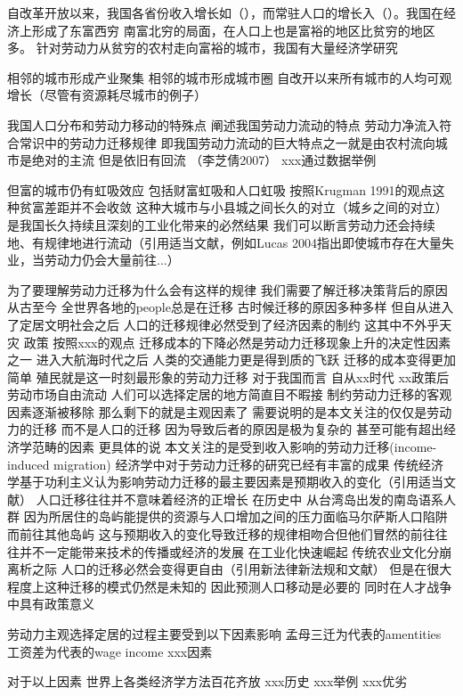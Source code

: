 \documentclass[10pt,a4paper]{article}
\begin{document}
自改革开放以来，我国各省份收入增长如（），而常驻人口的增长入（）。我国在经济上形成了东富西穷 南富北穷的局面，在人口上也是富裕的地区比贫穷的地区多。
针对劳动力从贫穷的农村走向富裕的城市，我国有大量经济学研究

相邻的城市形成产业聚集 相邻的城市形成城市圈 自改开以来所有城市的人均可观增长（尽管有资源耗尽城市的例子）

我国人口分布和劳动力移动的特殊点
阐述我国劳动力流动的特点
劳动力净流入符合常识中的劳动力迁移规律
即我国劳动力流动的巨大特点之一就是由农村流向城市是绝对的主流
但是依旧有回流
（李芝倩2007）
xxx通过数据举例

但富的城市仍有虹吸效应 包括财富虹吸和人口虹吸 按照Krugman 1991的观点这种贫富差距并不会收敛
这种大城市与小县城之间长久的对立（城乡之间的对立）是我国长久持续且深刻的工业化带来的必然结果 
我们可以断言劳动力还会持续地、有规律地进行流动（引用适当文献，例如Lucas 2004指出即使城市存在大量失业，当劳动力仍会大量前往...）


为了要理解劳动力迁移为什么会有这样的规律
我们需要了解迁移决策背后的原因
从古至今 全世界各地的people总是在迁移
古时候迁移的原因多种多样
但自从进入了定居文明社会之后 人口的迁移规律必然受到了经济因素的制约
这其中不外乎天灾 政策
按照xxx的观点 迁移成本的下降必然是劳动力迁移现象上升的决定性因素之一
进入大航海时代之后 人类的交通能力更是得到质的飞跃 迁移的成本变得更加简单 殖民就是这一时刻最形象的劳动力迁移
对于我国而言 自从xx时代 xx政策后 劳动市场自由流动 人们可以选择定居的地方简直目不暇接
制约劳动力迁移的客观因素逐渐被移除 那么剩下的就是主观因素了
需要说明的是本文关注的仅仅是劳动力的迁移 而不是人口的迁移 因为导致后者的原因是极为复杂的 甚至可能有超出经济学范畴的因素 更具体的说 本文关注的是受到收入影响的劳动力迁移(income-induced migration)
经济学中对于劳动力迁移的研究已经有丰富的成果
传统经济学基于功利主义认为影响劳动力迁移的最主要因素是预期收入的变化（引用适当文献）
人口迁移往往并不意味着经济的正增长 在历史中 从台湾岛出发的南岛语系人群 因为所居住的岛屿能提供的资源与人口增加之间的压力面临马尔萨斯人口陷阱而前往其他岛屿 这与预期收入的变化导致迁移的规律相吻合但他们冒然的前往往往并不一定能带来技术的传播或经济的发展
在工业化快速崛起 传统农业文化分崩离析之际 人口的迁移必然会变得更自由（引用新法律新法规和文献） 但是在很大程度上这种迁移的模式仍然是未知的 因此预测人口移动是必要的
同时在人才战争中具有政策意义 

劳动力主观选择定居的过程主要受到以下因素影响
孟母三迁为代表的amentities
工资差为代表的wage income
xxx因素

对于以上因素
世界上各类经济学方法百花齐放
xxx历史
xxx举例
xxx优劣
\end{document}

